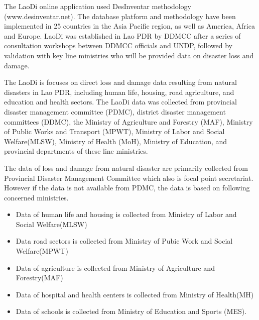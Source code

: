 \vspace{0.4 cm}

The LaoDi online application used DesInventar methodology (www.desinventar.net). The database platform and methodology have been implemented in 25 countries in the Asia Pacific region, as well as America, Africa and Europe. LaoDi was established in Lao PDR by DDMCC after a series of consultation workshops between DDMCC officials and UNDP, followed by validation with key line ministries who will be provided data on disaster loss and damage.

\vspace{0.4 cm}

The LaoDi is focuses on direct loss and damage data resulting from natural disasters in Lao PDR, including human life, housing, road agriculture, and education and health sectors. The LaoDi data was collected from provincial disaster management committee (PDMC), district disaster management committees (DDMC), the Ministry of Agriculture and Forestry (MAF), Ministry of Public Works and Transport (MPWT), Ministry of Labor and Social Welfare(MLSW), Ministry of Health (MoH), Ministry of Education, and provincial departments of these line ministries.

\vspace{0.4 cm}

The data of loss and damage from natural disaster are primarily collected from Provincial Disaster Management Committee which also is focal point secretariat. However if the data is not available from PDMC, the data is based on following concerned ministries.

\begin{itemize}
\item Data of human life and housing is collected from Ministry of Labor and Social Welfare(MLSW)
\item Data road sectors is collected from Ministry of Pubic Work and Social Welfare(MPWT)
\item Data of agriculture is collected from Ministry of Agriculture and Forestry(MAF)
\item Data of hospital and health centers is collected from Ministry of Health(MH)
\item Data of schools is collected from Ministry of Education and Sports (MES).
\end{itemize}


